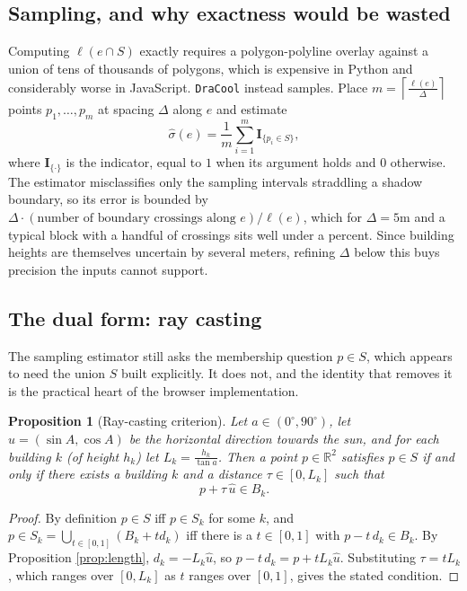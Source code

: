 \documentclass[11pt,a4paper]{article}
\theoremstyle{plain}
\newtheorem{proposition}{Proposition}
\theoremstyle{definition}
\theoremstyle{remark}
\begin{document}
\subsection{Sampling, and why exactness would be wasted}

Computing $\ell(e \cap S)$ exactly requires a polygon-polyline overlay against a union of tens of thousands of polygons, which is expensive in Python and considerably worse in JavaScript. \texttt{DraCool} instead samples. Place $\displaystyle m = \left\lceil \frac{\ell(e)}{\Delta} \right\rceil$ points $p_1, \dots, p_m$ at spacing $\Delta$ along $e$ and estimate
$$\hat{\sigma}(e) = \frac{1}{m}\sum_{i=1}^{m} \mathbf{I}_{\{p_i \in S\}},$$
where $\mathbf{I}_{\{\cdot\}}$ is the indicator, equal to $1$ when its argument holds and $0$ otherwise. The estimator misclassifies only the sampling intervals straddling a shadow boundary, so its error is bounded by $\Delta \cdot (\text{number of boundary crossings along } e) / \ell(e)$, which for $\Delta = 5$m and a typical block with a handful of crossings sits well under a percent. Since building heights are themselves uncertain by several meters, refining $\Delta$ below this buys precision the inputs cannot support.

\subsection{The dual form: ray casting}

The sampling estimator still asks the membership question $p \in S$, which appears to need the union $S$ built explicitly. It does not, and the identity that removes it is the practical heart of the browser implementation.

\begin{proposition}[Ray-casting criterion]
\label{prop:ray}
Let $a \in (0^\circ, 90^\circ)$, let $\hat{u} = (\sin A, \cos A)$ be the horizontal direction towards the sun, and for each building $k$ (of height $h_k$) let $L_k = \frac{h_k}{\tan a}$. Then a point $p \in \mathbb{R}^2$ satisfies $p \in S$ if and only if there exists a building $k$ and a distance $\tau \in [0, L_k]$ such that
$$p + \tau\,\hat{u} \in B_k.$$
\end{proposition}

\begin{proof}
By definition $p \in S$ iff $p \in S_k$ for some $k$, and $p \in S_k = \bigcup_{t\in[0,1]}(B_k + t d_k)$ iff there is a $t \in [0,1]$ with $p - t\,d_k \in B_k$. By Proposition \ref{prop:length}, $d_k = -L_k \hat{u}$, so $p - t\,d_k = p + t L_k \hat{u}$. Substituting $\tau = t L_k$, which ranges over $[0, L_k]$ as $t$ ranges over $[0,1]$, gives the stated condition.
\end{proof}
\end{document}

